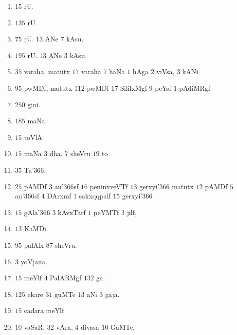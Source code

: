 \begin{multicols}{2}
\begin{enumerate}[$(1)$]
\item $15$ rU. 
\item $135$ rU.
\item $75$ rU. $13$ ANe $7$ kAsu.
\item $195$ rU. $13$ ANe $3$ kAsu.
\item $35$ varaha, matutx $17$ varaha $7$ haNa $1$ hAga $2$ viVsa, $3$
   kANi
\item $95$ pwMDf, matutx $112$ pwMDf $17$ SililxMgf $9$ peYsf $1$
pAdiMRgf
\item $250$ gini.
\item $185$ maNa.
\item $15$ toVlA
\item $15$ maNa $3$ dha. $7$ sheVru $19$ to
\item $35$ Ta\char'366.
\item $25$ pAMDf $3$ au\char'366sf $16$ peninxveVTf $13$
gerxyi{\char'366} matutx $12$ pAMDf $5$ au\char'366sf $4$ DArxmf $1$
sakxqqpalf $15$ gerxyi\char'366
\item $15$ gAla\char'366 $3$ kAvxTarf $1$ peYMTf $3$ jilf,
\item $13$ KaMDi.
\item $95$ palAlx $87$ sheVru.
\item $3$ yoVjana.
\item $15$ meYlf $4$ PalARMgf $132$ ga.
\item $125$ ekare $31$ guMTe $13$ aNi $3$ gaja.
\item $15$ cadara meYlf
\item $10$ vaSaR, $32$ vAra, $4$ divasa $10$ GaMTe.
\end{enumerate}
\end{multicols}


